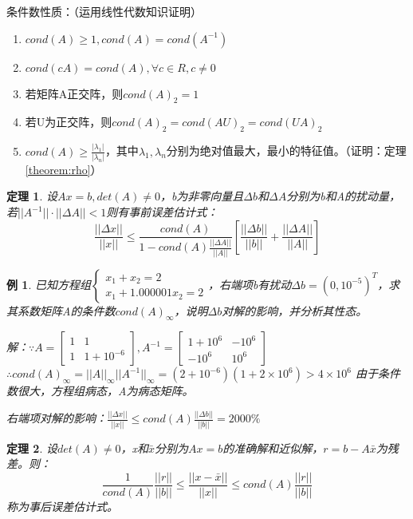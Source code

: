 \documentclass[a4paper]{article}
\newtheorem{theorem}{定理}[section]
\newtheorem{example}{例}[section]
\begin{document}
条件数性质：（运用线性代数知识证明）
\begin{enumerate}
  \item $cond(A)\ge 1, cond(A)=cond(A^{-1})$
  \item $cond(cA) = cond(A), \forall c\in R, c\neq 0$
  \item 若矩阵A正交阵，则$cond(A)_2=1$
  \item 若U为正交阵，则$cond(A)_2=cond(AU)_2=cond(UA)_2$
  \item $cond(A)\ge\frac{|\lambda_1|}{|\lambda_n|}$，其中$\lambda_1, \lambda_n$分别为绝对值最大，最小的特征值。（证明：定理\ref{theorem:rho}）
\end{enumerate}

\begin{theorem}
  设$Ax=b,det(A)\neq 0$，b为非零向量且$\Delta b$和$\Delta A$分别为b和A的扰动量，若$||A^{-1}||\cdot||\Delta A||<1$则有事前误差估计式：
  \begin{equation}
    \frac{||\Delta x||}{||x||} \le \frac{cond(A)}{1-cond(A)\frac{||\Delta A||}{||A||}}[\frac{||\Delta b||}{||b||}+\frac{||\Delta A||}{||A||}]
  \end{equation}
  \label{theorem:5.1}
\end{theorem}

\begin{example}
  已知方程组$\left\{\begin{array}{lr}
    x_1+x_2=2\\
    x_1+1.000001x_2=2
  \end{array}\right.$，右端项b有扰动$\Delta b=(0, 10^{-5})^T$，求其系数矩阵A的条件数$cond(A)_\infty$，说明$\Delta b$对解的影响，并分析其性态。

  解：$\because A=\left[\begin{matrix}
    1 & 1 \\
    1 & 1+10^{-6}
  \end{matrix}\right], A^{-1}=\left[\begin{matrix}
    1+10^6 & -10^6 \\
    -10^6 & 10^6
  \end{matrix}\right] $\\
  $\therefore cond(A)_\infty =||A||_\infty||A^{-1}||_\infty = (2+10^{-6})(1+2\times 10^6)>4\times 10^6$
  由于条件数很大，方程组病态，A为病态矩阵。

  右端项对解的影响：$\frac{||\Delta x||}{||x||} \le cond(A)\frac{||\Delta b||}{||b||}= 2000\%$
\end{example}

\begin{theorem}
  设$det(A)\neq 0$，x和$\bar{x}$分别为$Ax=b$的准确解和近似解，$r=b-A\bar{x}$为残差。则：
  \begin{equation}
    \frac{1}{cond(A)}\frac{||r||}{||b||}\le \frac{||x-\bar{x}||}{||x||}\le cond(A)\frac{||r||}{||b||}
  \end{equation}
  称为事后误差估计式。
  \label{theorem:after}
\end{theorem}
\end{document}
